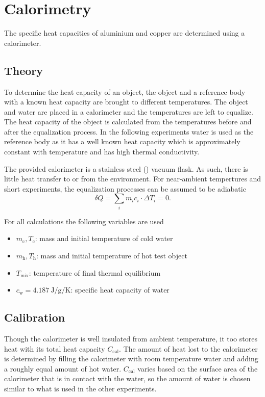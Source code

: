 \chapter{Calorimetry}
The specific heat capacities of aluminium and copper are determined using a calorimeter.

\section{Theory}\label{sec:cal-theory}
To determine the heat capacity of an object, the object and a reference body with a known heat capacity are brought to different temperatures.
The object and water are placed in a calorimeter and the temperatures are left to equalize.
The heat capacity of the object is calculated from the temperatures before and after the equalization process.
In the following experiments water is used as the reference body as it has a well known heat capacity which is approximately constant with temperature and has high thermal conductivity.

The provided calorimeter is a stainless steel () vacuum flask.
As such, there is little heat transfer to or from the environment.
For near-ambient tempertures and short experiments, the equalization processes can be assumed to be adiabatic
\begin{equation}\label{eq:adiabatic}
	\delta Q = \sum_i m_i c_i \cdot \Delta T_i = 0.
\end{equation}

For all calculations the following variables are used
\begin{itemize}
	\item $m_\text{c}, T_\text{c}$: mass and initial temperature of cold water
	\item $m_\text{h}, T_\text{h}$: mass and initial temperature of hot test object
	\item $T_\text{mix}$: temperature of final thermal equilibrium
	\item $c_\text{w} = \SI{4.187}{\joule\per\gram\per\kelvin}$: specific heat capacity of water
\end{itemize}

\section{Calibration}
Though the calorimeter is well insulated from ambient temperature, it too stores heat with its total heat capacity $C_\text{cal}$.
The amount of heat lost to the calorimeter is determined by filling the calorimeter with room temperature water and adding a roughly equal amount of hot water.
$C_\text{cal}$ varies based on the surface area of the calorimeter that is in contact with the water, so the amount of water is chosen similar to what is used in the other experiments.

